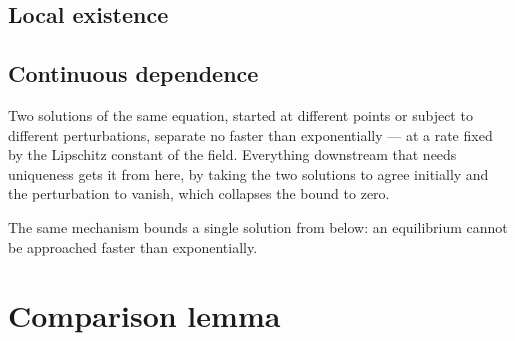 


\subsection{Local existence}









\subsection{Continuous dependence}

Two solutions of the same equation, started at different points or subject to different
perturbations, separate no faster than exponentially — at a rate fixed by the Lipschitz constant
of the field. Everything downstream that needs uniqueness gets it from here, by taking the two
solutions to agree initially and the perturbation to vanish, which collapses the bound to zero.



The same mechanism bounds a single solution from below: an equilibrium cannot be approached
faster than exponentially.


\section{Comparison lemma}

